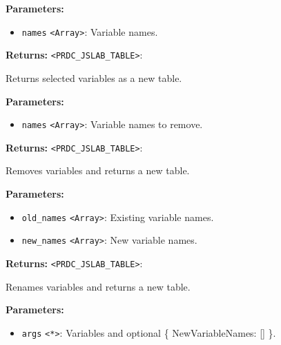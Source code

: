 \documentclass[12pt,a4paper]{article}
\begin{document}
\noindent \textbf{Parameters:}
\begin{itemize}
  \item \texttt{names} \texttt{<Array>}: Variable names.
\end{itemize}

\noindent \textbf{Returns:} \texttt{<PRDC\_JSLAB\_TABLE>}:

\noindent Returns selected variables as a new table.

\vspace{5mm}
\noindent {}


\noindent \textbf{Parameters:}
\begin{itemize}
  \item \texttt{names} \texttt{<Array>}: Variable names to remove.
\end{itemize}

\noindent \textbf{Returns:} \texttt{<PRDC\_JSLAB\_TABLE>}:

\noindent Removes variables and returns a new table.

\vspace{5mm}
\noindent {}


\noindent \textbf{Parameters:}
\begin{itemize}
  \item \texttt{old\_names} \texttt{<Array>}: Existing variable names.
  \item \texttt{new\_names} \texttt{<Array>}: New variable names.
\end{itemize}

\noindent \textbf{Returns:} \texttt{<PRDC\_JSLAB\_TABLE>}:

\noindent Renames variables and returns a new table.

\vspace{5mm}
\noindent {}


\noindent \textbf{Parameters:}
\begin{itemize}
  \item \texttt{args} \texttt{<*>}: Variables and optional \{ NewVariableNames: [] \}.
\end{itemize}
\end{document}
